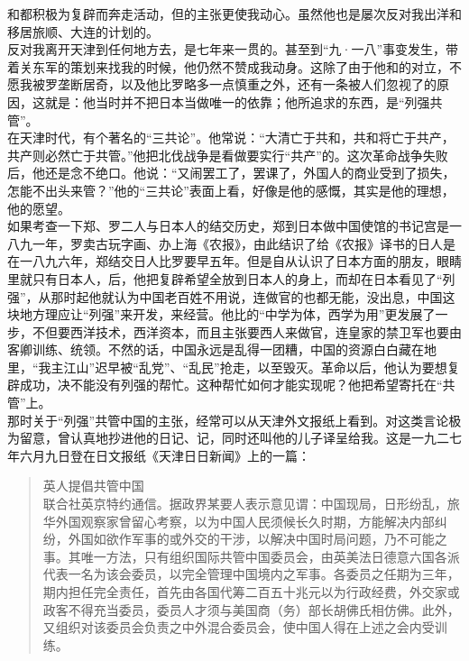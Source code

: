 和都积极为复辟而奔走活动，但的主张更使我动心。虽然他也是屡次反对我出洋和移居旅顺、大连的计划的。\\

反对我离开天津到任何地方去，是七年来一贯的。甚至到“九·一八”事变发生，带着关东军的策划来找我的时候，他仍然不赞成我动身。这除了由于他和的对立，不愿我被罗垄断居奇，以及他比罗略多一点慎重之外，还有一条被人们忽视了的原因，这就是：他当时并不把日本当做唯一的依靠；他所追求的东西，是“列强共管”。\\

在天津时代，有个著名的“三共论”。他常说：“大清亡于共和，共和将亡于共产，共产则必然亡于共管。”他把北伐战争是看做要实行“共产”的。这次革命战争失败后，他还是念不绝口。他说：“又闹罢工了，罢课了，外国人的商业受到了损失，怎能不出头来管？”他的“三共论”表面上看，好像是他的感慨，其实是他的理想，他的愿望。\\

如果考查一下郑、罗二人与日本人的结交历史，郑到日本做中国使馆的书记宫是一八九一年，罗卖古玩字画、办上海《农报》，由此结识了给《农报》译书的日人是在一八九六年，郑结交日人比罗要早五年。但是自从认识了日本方面的朋友，眼睛里就只有日本人，后，他把复辟希望全放到日本人的身上，而却在日本看见了“列强”，从那时起他就认为中国老百姓不用说，连做官的也都无能，没出息，中国这块地方理应让“列强”来开发，来经营。他比的“中学为体，西学为用”更发展了一步，不但要西洋技术，西洋资本，而且主张要西人来做官，连皇家的禁卫军也要由客卿训练、统领。不然的话，中国永远是乱得一团糟，中国的资源白白藏在地里，“我主江山”迟早被“乱党”、“乱民”抢走，以至毁灭。革命以后，他认为要想复辟成功，决不能没有列强的帮忙。这种帮忙如何才能实现呢？他把希望寄托在“共管”上。\\

那时关于“列强”共管中国的主张，经常可以从天津外文报纸上看到。对这类言论极为留意，曾认真地抄进他的日记、记，同时还叫他的儿子译呈给我。这是一九二七年六月九日登在日文报纸《天津日日新闻》上的一篇：\\

\begin{quote}
	英人提倡共管中国\\

联合社英京特约通信。据政界某要人表示意见谓：中国现局，日形纷乱，旅华外国观察家曾留心考察，以为中国人民须候长久时期，方能解决内部纠纷，外国如欲作军事的或外交的干涉，以解决中国时局问题，乃不可能之事。其唯一方法，只有组织国际共管中国委员会，由英美法日德意六国各派代表一名为该会委员，以完全管理中国境内之军事。各委员之任期为三年，期内担任完全责任，首先由各国代筹二百五十兆元以为行政经费，外交家或政客不得充当委员，委员人才须与美国商（务）部长胡佛氏相仿佛。此外，又组织对该委员会负责之中外混合委员会，使中国人得在上述之会内受训练。\\
\end{quote}

